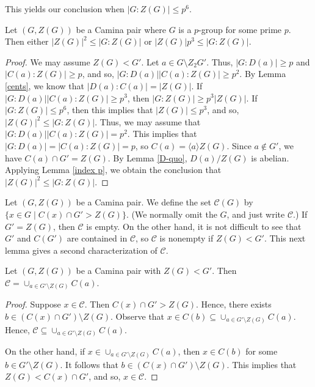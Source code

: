 This yields our conclusion when $|G:Z (G)| \le p^6$.

\begin{corollary} \label{m=2}
Let $(G,Z(G))$ be a Camina pair where $G$ is a $p$-group for some prime $p$.  Then either $|Z(G)|^2 \le |G:Z(G)|$ or $|Z(G)|p^3 \le |G:Z(G)|$.
\end{corollary}

\begin{proof}
We may assume $Z(G) < G'$.  Let $a \in G \setminus Z_2 G'$.  Thus, $|G:D(a)| \ge p$ and $|C(a):Z(G)| \ge p$, and so, $|G:D(a)||C(a):Z(G)| \ge p^2$.  By Lemma \ref{cents}, we know that $|D(a):C(a)| = |Z(G)|$.  If $|G:D(a)||C(a):Z(G)| \ge p^3$, then $|G:Z(G)| \ge p^3 |Z(G)|$.  If $|G:Z(G)| \le p^6$, then this implies that $|Z(G)| \le p^3$, and so, $|Z(G)|^2 \le |G:Z(G)|$. Thus, we may assume that $|G:D(a)||C(a):Z(G)| = p^2$.  This implies that $|G:D(a)| = |C(a):Z(G)| = p$, so $C(a) = \langle a \rangle Z(G)$.  Since $a \not\in G'$, we have $C(a) \cap G' = Z(G)$.  By Lemma \ref{D-quo}, $D(a)/Z(G)$ is abelian.  Applying Lemma \ref{index p}, we obtain the conclusion that $|Z(G)|^2 \le |G:Z(G)|$.
\end{proof}

Let $(G, Z(G))$ be a Camina pair.  We define the set ${\mathcal C} (G)$ by $\{ x \in G \mid C (x) \cap G' > Z (G) \}$.  (We normally omit the $G$, and just write ${\mathcal C}$.)  If $G' = Z(G)$, then ${\mathcal C}$ is empty.  On the other hand, it is not difficult to see that $G'$ and $C (G')$ are contained in ${\mathcal C}$, so ${\mathcal C}$ is nonempty if $Z(G) < G'$.  This next lemma gives a second characterization of ${\mathcal C}$.

\begin{lemma}\label{scriptC}
Let $(G,Z (G))$ be a Camina pair with $Z (G) < G'$.  Then ${\mathcal C} = \cup_{a \in G' \setminus Z (G)} C (a)$.
\end{lemma}

\begin{proof}
Suppose $x \in {\mathcal C}$.  Then $C (x) \cap G' > Z (G)$.  Hence, there exists $b \in (C (x) \cap G') \setminus Z (G)$.  Observe that $x \in C (b) \subseteq \cup_{a \in G' \setminus Z (G)} C (a)$.  Hence, ${\mathcal C} \subseteq \cup_{a \in G' \setminus Z (G)} C (a)$.

On the other hand, if $x \in \cup_{a \in G' \setminus Z (G)} C (a)$, then $x \in C (b)$ for some $b \in G' \setminus Z (G)$.  It follows that $b \in (C(x) \cap G') \setminus Z (G)$.  This implies that $Z (G) < C (x) \cap G'$, and so, $x \in {\mathcal C}$.
\end{proof}

